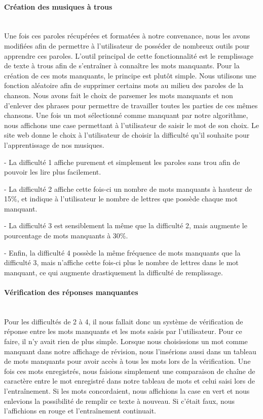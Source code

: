 \documentclass[12pt,french]{article}
\begin{document}
\paragraph{Création des musiques à trous \\\\}

Une fois ces paroles récupérées et formatées à notre convenance, nous les avons modifiées afin de permettre à l'utilisateur de posséder de nombreux outils pour apprendre ces paroles. L'outil principal de cette fonctionnalité est le remplissage de texte à trous afin de s'entraîner à connaître les mots manquants. Pour la création de ces mots manquants, le principe est plutôt simple. Nous utilisons une fonction aléatoire afin de supprimer certains mots au milieu des paroles de la chanson. Nous avons fait le choix de parsemer les mots manquants et non d'enlever des phrases pour permettre de travailler toutes les parties de ces mêmes chansons. Une fois un mot sélectionné comme manquant par notre algorithme, nous affichons une case permettant à l'utilisateur de saisir le mot de son choix. Le site web donne le choix à l'utilisateur de choisir la difficulté qu'il souhaite pour l'apprentissage de nos musiques.
\newline

- La difficulté 1 affiche purement et simplement les paroles sans trou afin de pouvoir les lire plus facilement. 

- La difficulté 2 affiche cette fois-ci un nombre de mots manquants à hauteur de 15\%, et indique à l'utilisateur le nombre de lettres que possède chaque mot manquant.

- La difficulté 3 est sensiblement la même que la difficulté 2, mais augmente le pourcentage de mots manquants à 30\%.

- Enfin, la difficulté 4 possède la même fréquence de mots manquants que la difficulté 3, mais n'affiche cette fois-ci plus le nombre de lettres dans le mot manquant, ce qui augmente drastiquement la difficulté de remplissage.  
     
\paragraph{Vérification des réponses manquantes \\\\}

Pour les difficultés de 2 à 4, il nous fallait donc un système de vérification de réponse entre les mots manquants et les mots saisis par l'utilisateur. Pour ce faire, il n'y avait rien de plus simple. Lorsque nous choisissions un mot comme manquant dans notre affichage de révision, nous l'insérions aussi dans un tableau de mots manquants pour avoir accès à tous les mots lors de la vérification. Une fois ces mots enregistrés, nous faisions simplement une comparaison de chaîne de caractère entre le mot enregistré dans notre tableau de mots et celui saisi lors de l'entraînement. Si les mots concordaient, nous affichions la case en vert et nous enlevions la possibilité de remplir ce texte à nouveau. Si c'était faux, nous l'affichions en rouge et l'entraînement continuait.
\end{document}
